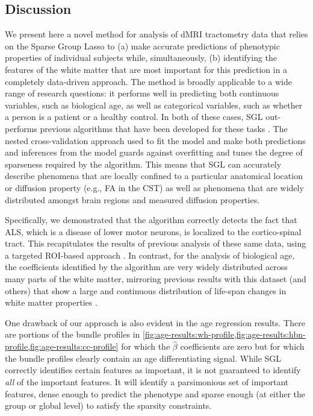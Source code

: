 \subsection*{Discussion}

We present here a novel method for analysis of dMRI tractometry data that relies
on the Sparse Group Lasso \cite{simon2013sparse} to (a) make accurate
predictions of phenotypic properties of individual subjects while,
simultaneously, (b) identifying the features of the white matter that are most
important for this prediction in a completely data-driven approach. The method
is broadly applicable to a wide range of research questions: it performs well in
predicting both continuous variables, such as biological age, as well as
categorical variables, such as whether a person is a patient or a healthy
control. In both of these cases, SGL out-performs previous algorithms that have
been developed for these tasks \cite{sarica2017corticospinal, Richard2018-ux}.
The nested cross-validation approach used to fit the model and make both
predictions and inferences from the model guards against overfitting and tunes
the degree of sparseness required by the algorithm. This means that SGL can
accurately describe phenomena that are locally confined to a particular
anatomical location or diffusion property (e.g., FA in the CST) as well as
phenomena that are widely distributed amongst brain regions and measured
diffusion properties.

Specifically, we demonstrated that the algorithm correctly detects
the fact that ALS, which is a disease of lower motor neurons, is
localized to the cortico-spinal tract. This recapitulates the results
of previous analysis of these same data, using a targeted ROI-based
approach \cite{sarica2017corticospinal}. In contrast, for the analysis
of biological age, the coefficients identified by the algorithm are very
widely distributed across many parts of the white matter, mirroring
previous results with this dataset (and others) that show a large and
continuous distribution of life-span changes in white matter properties
\cite{yeatman2014lifespan}.

One drawback of our approach is also evident in the age regression results.
There are portions of the bundle profiles in
\cref{fig:age-results:wh-profile,fig:age-results:hbn-profile,fig:age-results:cc-profile}
for which the $\hat{\beta}$ coefficients are zero but for which the bundle
profiles clearly contain an age differentiating signal. While SGL correctly
identifies certain features as important, it is not guaranteed to identify
\emph{all} of the important features. It will identify a parsimonious set of
important features, dense enough to predict the phenotype and sparse enough
(at either the group or global level) to satisfy the sparsity constraints.


